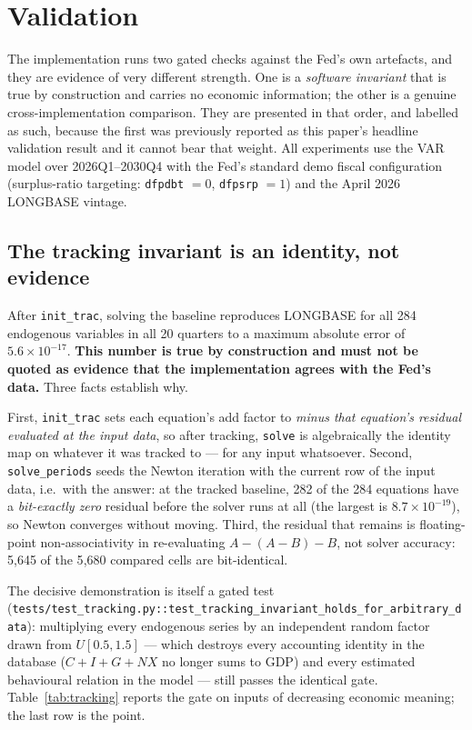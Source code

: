 \section{Validation}
\label{sec:validation}

The implementation runs two gated checks against the Fed's own artefacts, and they are evidence of very different strength. One is a \emph{software invariant} that is true by construction and carries no economic information; the other is a genuine cross-implementation comparison. They are presented in that order, and labelled as such, because the first was previously reported as this paper's headline validation result and it cannot bear that weight. All experiments use the VAR model over 2026Q1--2030Q4 with the Fed's standard demo fiscal configuration (surplus-ratio targeting: \texttt{dfpdbt} $=0$, \texttt{dfpsrp} $=1$) and the April 2026 LONGBASE vintage.

\subsection{The tracking invariant is an identity, not evidence}
\label{subsec:tracking}

After \texttt{init\_trac}, solving the baseline reproduces LONGBASE for all 284 endogenous variables in all 20 quarters to a maximum absolute error of $5.6\times10^{-17}$. \textbf{This number is true by construction and must not be quoted as evidence that the implementation agrees with the Fed's data.} Three facts establish why.

First, \texttt{init\_trac} sets each equation's add factor to \emph{minus that equation's residual evaluated at the input data}, so after tracking, \texttt{solve} is algebraically the identity map on whatever it was tracked to --- for any input whatsoever. Second, \texttt{solve\_periods} seeds the Newton iteration with the current row of the input data, i.e.\ with the answer: at the tracked baseline, 282 of the 284 equations have a \emph{bit-exactly zero} residual before the solver runs at all (the largest is $8.7\times10^{-19}$), so Newton converges without moving. Third, the residual that remains is floating-point non-associativity in re-evaluating $A - (A-B) - B$, not solver accuracy: 5{,}645 of the 5{,}680 compared cells are bit-identical.

The decisive demonstration is itself a gated test (\texttt{tests/test\_tracking.py::\allowbreak test\_\allowbreak tracking\_\allowbreak invariant\_\allowbreak holds\_\allowbreak for\_\allowbreak arbitrary\_\allowbreak data}): multiplying every endogenous series by an independent random factor drawn from $U[0.5,1.5]$ --- which destroys every accounting identity in the database ($C+I+G+NX$ no longer sums to GDP) and every estimated behavioural relation in the model --- still passes the identical gate. Table~\ref{tab:tracking} reports the gate on inputs of decreasing economic meaning; the last row is the point.

